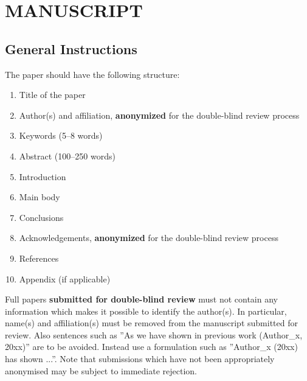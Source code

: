 \documentclass{isprs} %
\begin{document}
\maketitle


\section{MANUSCRIPT}\label{MANUSCRIPT}
 
\sloppy

\subsection{General Instructions}\label{sec:General Instructions}

The paper should have the following structure: 

\begin{enumerate}
\setlength\itemsep{0em}\setlength\parskip{0em}\setlength\topsep{0em}\setlength\partopsep{0em}\setlength\parsep{0em} 
\item{Title of the paper} 
\item{Author(s) and affiliation, \textbf{anonymized} for the double-blind review process}
\item{Keywords (5--8 words)}
\item{Abstract (100--250 words)}
\item{Introduction}
\item{Main body}
\item{Conclusions}
\item{Acknowledgements,  \textbf{anonymized} for the double-blind review process}
\item{References}
\item{Appendix (if applicable)}
\end{enumerate}

Full papers \textbf{submitted for double-blind review} must not contain any information which makes it possible to identify the author(s). In particular, name(s) and affiliation(s) must be removed from the manuscript submitted for review. Also sentences such as ''As we have shown in previous work (Author\_x, 20xx)'' are to be avoided. Instead use a formulation such as ''Author\_x (20xx) has shown ...''. Note that submissions which have not been appropriately anonymised may be subject to immediate rejection.\\
\end{document}
